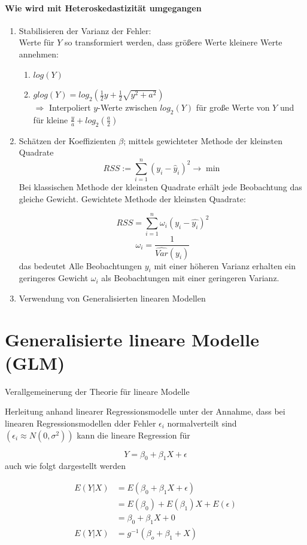 \documentclass[10pt]{report}
\theoremstyle{definition}
\begin{document}
\paragraph{Wie wird mit Heteroskedastizität umgegangen}
\begin{enumerate}
	\item Stabilisieren der Varianz der Fehler:\\
		Werte für $Y$ so transformiert werden, dass größere Werte kleinere Werte annehmen:
		\begin{enumerate}
			\item $log(Y)$
			\item $glog(Y) = log_{2}(\frac{1}{2} y + \frac{1}{2}\sqrt{y^{2} + a^{2}} ) $ \\
				$\Rightarrow$ Interpoliert $y$-Werte zwischen $log_2(Y)$ für große Werte von $Y$ und für kleine $\frac{y}{a} + log_2(\frac{a}{2})$
		\end{enumerate}
	\item Schätzen der Koeffizienten \(\beta\); mittels gewichteter Methode der kleinsten Quadrate
		\[ RSS := \sum_{i=1}^{n}(y_i - \hat{y}_i)^2 \rightarrow \min \]
		Bei klassischen Methode der kleinsten Quadrate erhält jede Beobachtung das gleiche Gewicht.
		Gewichtete Methode der kleinsten Quadrate:

		\[ RSS = \sum_{i = 1}^{n}\omega_i (y_i - \widehat{y_i})^2 \]
		\[ \omega_i = \dfrac{1}{\hat{Var}(y_i)} \]
		das bedeutet Alle Beobachtungen \(y_i\) mit einer höheren Varianz erhalten ein geringeres Gewicht \(\omega_i\) als Beobachtungen mit einer geringeren Varianz.  
	\item Verwendung von Generalisierten linearen Modellen
\end{enumerate}

\section{Generalisierte lineare Modelle (GLM)}
Verallgemeinerung der Theorie für lineare Modelle

Herleitung anhand linearer Regressionsmodelle
unter der Annahme, dass bei linearen Regressionsmodellen dder Fehler \( \epsilon_i\) normalverteilt sind \((\epsilon_i \approx N(0, \sigma^2))\) kann die lineare Regression für

\[ Y = \beta_0 + \beta_1 X + \epsilon \]
auch wie folgt dargestellt werden

\begin{align*}
E(Y|X) &= E(\beta_0 + \beta_1 X + \epsilon)\\
&=  E(\beta_0) + E(\beta_1) X + E(\epsilon)\\
&= \beta_0 + \beta_1 X + 0\\
E(Y|X) &= g^{-1} (\beta_o + \beta_1 + X)
\end{align*}
\end{document}
